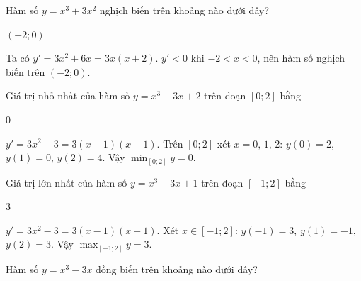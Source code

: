 \documentclass{exam}
\begin{document}
\begin{question}
Hàm số $y = x^3 + 3x^2$ nghịch biến trên khoảng nào dưới đây?





\end{question}

\begin{dapan}
$(-2; 0)$
\end{dapan}


\begin{loigiai}
Ta có $y' = 3x^2 + 6x = 3x(x+2)$. $y' < 0$ khi $-2 < x < 0$, nên hàm số nghịch biến trên $(-2; 0)$.
\end{loigiai}



\begin{question}
Giá trị nhỏ nhất của hàm số $y = x^3 - 3x + 2$ trên đoạn $[0; 2]$ bằng





\end{question}

\begin{dapan}
$0$
\end{dapan}


\begin{loigiai}
$y' = 3x^2 - 3 = 3(x-1)(x+1)$. Trên $[0; 2]$ xét $x = 0,\,1,\,2$: $y(0) = 2$, $y(1) = 0$, $y(2) = 4$. Vậy $\min_{[0;2]} y = 0$.
\end{loigiai}



\begin{question}
Giá trị lớn nhất của hàm số $y = x^3 - 3x + 1$ trên đoạn $[-1; 2]$ bằng





\end{question}

\begin{dapan}
$3$
\end{dapan}


\begin{loigiai}
$y' = 3x^2 - 3 = 3(x-1)(x+1)$. Xét $x \in [-1; 2]$: $y(-1) = 3$, $y(1) = -1$, $y(2) = 3$. Vậy $\max_{[-1;2]} y = 3$.
\end{loigiai}



\begin{question}
Hàm số $y = x^3 - 3x$ đồng biến trên khoảng nào dưới đây?





\end{question}
\end{document}
